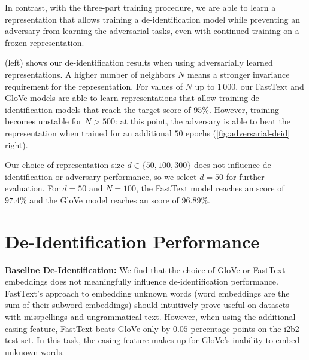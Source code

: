 %
In contrast, with the three-part training procedure, we are able to learn a representation that allows training a de-identification model while preventing an adversary from learning the adversarial tasks, even with continued training on a frozen representation.

%
 (left) shows our de-identification results when using adversarially learned representations.
%
A higher number of neighbors $N$ means a stronger invariance requirement for the representation.
%
For values of $N$ up to $1\,000$, our FastText and GloVe models are able to learn representations that allow training de-identification models that reach the target \fone score of $95\%$.
%
However, training becomes unstable for $N>500$: at this point, the adversary is able to beat the representation when trained for an additional $50$ epochs (\cref{fig:adversarial-deid} right).

%
Our choice of representation size $d \in \{50, 100, 300\}$ does not influence de-identifi\-ca\-tion or adversary performance, so we select $d=50$ for further evaluation.
%
For $d=50$ and $N=100$, the FastText model reaches an \fone score of $97.4\%$ and the GloVe model reaches an \fone score of $96.89\%$.

\begin{figure*}
    \centering
    
    \caption[De-identification with adversarially learned representations]{%
        Left: de-identification \fone scores of our models using an adversarially trained representation with different numbers of neighbors $N$ for the representation invariance requirement.
        Right: mean adversary accuracy when trained on the frozen representation for an additional $50$ epochs.
    }\label{fig:adversarial-deid}
\end{figure*}

\section{De-Identification Performance}

\textbf{Baseline De-Identification:}
%
We find that the choice of GloVe or FastText embeddings does not meaningfully influence de-identification performance.
%
FastText's approach to embedding unknown words (word embeddings are the sum of their subword embeddings) should intuitively prove useful on datasets with misspellings and ungrammatical text.
%
However, when using the additional casing feature, FastText beats GloVe only by $0.05$ percentage points on the i2b2 test set.
%
In this task, the casing feature makes up for GloVe's inability to embed unknown words.

